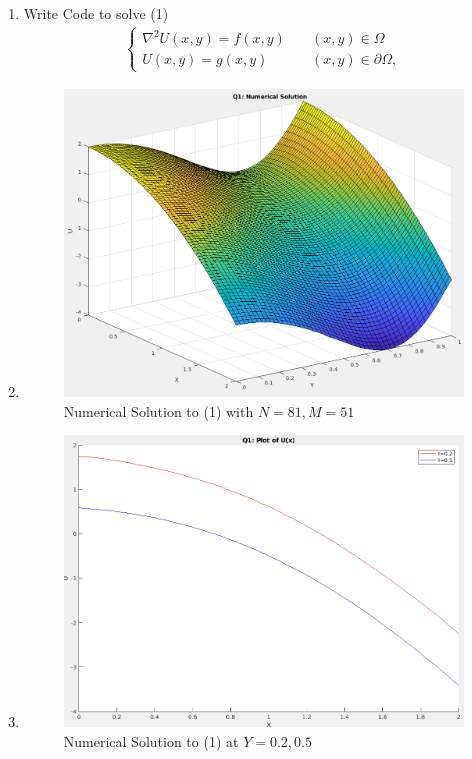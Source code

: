 \documentclass{article}
\begin{document}
\begin{enumerate}[label=\alph*)]

    \item Write Code to solve (1)
    \begin{align}
        \begin{cases}
            \nabla^2 U(x,y) = f(x,y) \quad &(x, y) \in \Omega\\
            U(x,y) = g(x,y) \quad &(x,y) \in \partial\Omega,
        \end{cases} 
    \end{align}

    \item 
    \begin{figure}[ht]
        \centering
        \includegraphics[width=.6\textwidth]{q1_num_sol.png}
        \caption{Numerical Solution to (1) with $N=81, M=51$}
    \end{figure}

    \item 
    \begin{figure}[ht]
        \centering
        \includegraphics[width=.6\textwidth]{q1_num_sol_yconst.png}
        \caption{Numerical Solution to (1) at $Y=0.2, 0.5$}
    \end{figure}

\end{enumerate}
\end{document}

